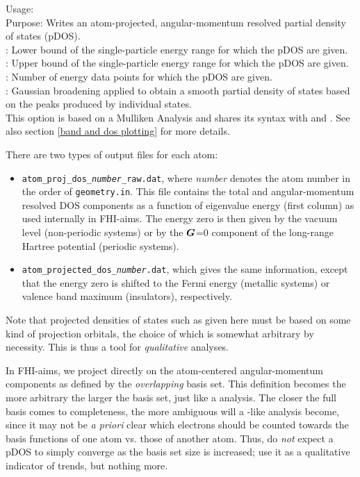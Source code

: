 {
  Usage:  
   \\[1.0ex]
  Purpose: Writes an atom-projected, angular-momentum resolved partial
    density of states (pDOS). \\[1.0ex]
   : Lower bound of the single-particle energy range
    for which the pDOS are given. \\
   : Upper bound of the single-particle energy range
    for which the pDOS are given. \\
   : Number of energy data points for which the
    pDOS are given. \\
   : Gaussian broadening applied to obtain a smooth
    partial density of states based on the peaks produced by
    individual states. \\
}
This option is based on a Mulliken Analysis and shares its syntax with
  and 
. See also section \ref{band
and dos plotting} for more details.

There are two types of output files for each atom:
\begin{itemize}
  \item \texttt{atom\_proj\_dos\_\emph{number}\_raw.dat}, where \emph{number}
    denotes the atom number in the order of \texttt{geometry.in}. This file
    contains the total and angular-momentum resolved DOS components as a
    function of eigenvalue energy (first column) as used internally in
    FHI-aims. The energy zero is then given by the vacuum level (non-periodic
    systems) or by the $\mbox{\boldmath$G$}$=0 component of the long-range Hartree
    potential (periodic systems).
  \item \texttt{atom\_projected\_dos\_\emph{number}.dat}, which gives the same
    information, except that the energy zero is shifted to the Fermi energy
    (metallic systems) or valence band maximum (insulators), respectively.
\end{itemize}
Note that projected densities of states such as given here must be
based on some kind of projection orbitals, the choice of which is
somewhat arbitrary by necessity. This is thus a tool for
\emph{qualitative} analyses.

In FHI-aims, we project directly on
the atom-centered angular-momentum components as defined by the
\emph{overlapping} basis set. This definition becomes the more arbitrary the
larger the basis set, just like a 
analysis. The closer the full basis comes to completeness, the
more ambiguous will a -like analysis become,
since it may not be \emph{a priori} clear which electrons should be counted
towards the basis functions of one atom vs. those of another atom. Thus, do
\emph{not} expect a pDOS to simply converge as the basis set size is
increased; use it as a qualitative indicator of trends, but nothing more.

